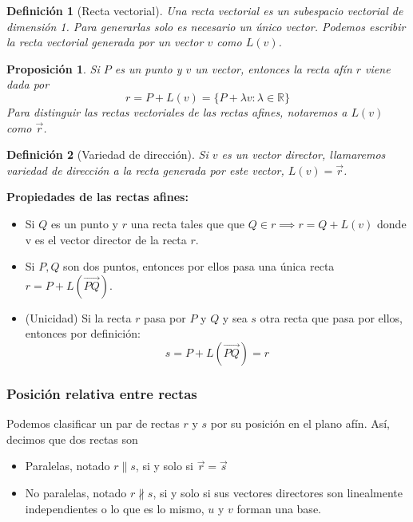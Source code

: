 \documentclass[11pt, a4paper, titlepage]{article}
\makeatletter
\renewenvironment{proof}[1][\proofname] {\vspace{-15pt}\par\pushQED{\qed}\normalfont\topsep6\p@\@plus6\p@\relax\trivlist\item[\hskip\labelsep\it#1\@addpunct{.}]\ignorespaces}{\popQED\endtrivlist\@endpefalse}
\newcommand{\R}{\mathbb{R}}
\renewcommand{\vec}{\overrightarrow}
\theoremstyle{theorem-style}
\newtheorem*{nprop}{Proposición}
\theoremstyle{definition-style}
\newtheorem*{ndef}{Definición}
\theoremstyle{remark-style}
\theoremstyle{example-style}
\makeatother
\begin{document}
\begin{ndef}[Recta vectorial]
  Una recta vectorial es un subespacio vectorial de dimensión 1. Para generarlas solo es necesario un único vector. Podemos escribir la \textit{recta vectorial generada por un vector} $v$ como $L(v)$.
\end{ndef}

\begin{nprop}
  Si $P$ es un punto y $v$ un vector, entonces la recta afín $r$ viene dada por
  \[
    r = P+L(v) = \{P + \lambda v : \lambda \in \R\}
  \]
  Para distinguir las rectas vectoriales de las rectas afines, notaremos a $L(v)$ como $\vec{r}$.
\end{nprop}
\begin{ndef}[Variedad de dirección]
  Si $v$ es un \textit{vector director}, llamaremos \textit{variedad de dirección} a la recta generada por este vector, $L(v) = \vec{r}$.
\end{ndef}

\textbf{Propiedades de las rectas afines:}
\begin{itemize}
\item Si $Q$ es un punto y $r$ una recta tales que que $Q\in r \implies r = Q +L(v)$ donde v es el vector director de la recta $r$.
\item Si $P,Q$ son dos puntos, entonces por ellos pasa una única recta $r = P +L(\overrightarrow{PQ})$. \\
  \begin{proof}
    (Unicidad) Si la recta $r$ pasa por $P$ y $Q$ y sea $s$ otra recta que pasa por ellos, entonces por definición:
    \[
      s = P+L(\overrightarrow{PQ}) = r
    \]
  \end{proof}
\end{itemize}

\subsubsection{Posición relativa entre rectas}

Podemos clasificar un par de rectas $r$ y $s$ por su posición en el plano afín. Así, decimos que dos rectas son

\begin{itemize}
\item Paralelas, notado $r\parallel s$, si y solo si $\vec{r} = \vec{s}$
\item No paralelas, notado $r\nparallel s$, si y solo si sus vectores directores son linealmente independientes o lo que es lo mismo, $u$ y $v$ forman una base.
\end{itemize}
\end{document}
